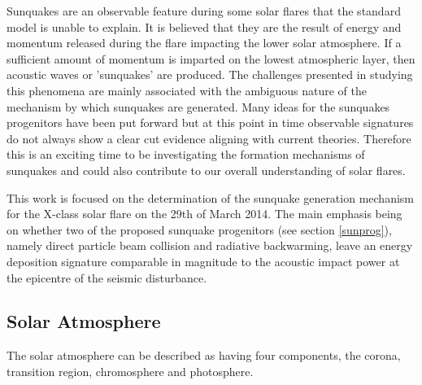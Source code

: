 Sunquakes are an observable feature during some solar flares that the standard model is unable to explain. It is believed that they are the result of energy and momentum released during the flare impacting the lower solar atmosphere. If a sufficient amount of momentum is imparted on the lowest atmospheric layer, then acoustic waves or 'sunquakes' are produced. The challenges presented in studying this phenomena are mainly associated with the ambiguous nature of the mechanism by which sunquakes are generated. Many ideas for the sunquakes progenitors have been put forward but at this point in time observable signatures do not always show a clear cut evidence aligning with current theories. Therefore this is an exciting time to be investigating the formation mechanisms of sunquakes and could also contribute to our overall understanding of solar flares. 

This work is focused on the determination of the sunquake generation mechanism for the X-class solar flare on the 29th of March 2014. The main emphasis being on whether two of the proposed sunquake progenitors (see section \ref{sunprog}), namely direct particle beam collision and radiative backwarming, leave an energy deposition signature comparable in magnitude to the acoustic impact power at the epicentre of the seismic disturbance.      
\subsection{Solar Atmosphere}
The solar atmosphere can be described as having four components, the corona, transition region, chromosphere and photosphere. 




